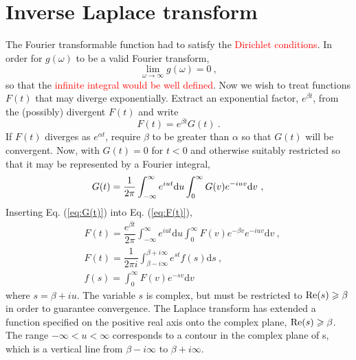 \documentclass[12pt,a4paper]{article}
\newcommand{\dif}{\mathrm{d}}
\begin{document}
\section{Inverse Laplace transform}
\cite{arfken} The Fourier transformable function had to satisfy the \textcolor{red}{Dirichlet conditions}. In order for $g(\omega)$ to be a valid Fourier transform,
\begin{equation}
\lim_{\omega \rightarrow \infty} g(\omega) = 0 ~,
\end{equation}
so that the \textcolor{red}{infinite integral would be well defined}. Now we wish to treat functions $F(t)$ that may diverge exponentially. Extract an exponential factor, $e^{\beta t}$, from the (possibly) divergent $F(t)$ and write
\begin{equation}
F(t) = e^{\beta t} G(t) ~.
\label{eq:F(t)}
\end{equation}
If $F(t)$ diverges as $e^{\alpha t}$, require $\beta$ to be greater than $\alpha$ so that $G(t)$ will be convergent. Now, with $G(t) = 0$ for $t < 0$ and otherwise suitably restricted so that it may be represented by a Fourier integral,
\begin{equation}
G(t) = \dfrac{1}{2\pi} \int_{-\infty}^\infty e^{iut} \dif u \int_0^\infty G(v) e^{-iuv} \dif v ~, \\
\label{eq:G(t)}
\end{equation}
Inserting Eq. (\ref{eq:G(t)}) into Eq. (\ref{eq:F(t)}), 
\begin{align*}
& F(t) = \dfrac{e^{\beta t}}{2\pi} \int_{-\infty}^\infty e^{iut} \dif u \int_0^\infty F(v) e^{-\beta v} e^{-iuv} \dif v ~, \\
& F(t) = \dfrac{1}{2\pi i} \int_{\beta -i\infty}^{\beta +i\infty } e^{st} f(s) \dif s ~, \\
& f(s) = \int_0^\infty F(v) e^{-s v} \dif v 
\end{align*}
where $s = \beta +i u$. The variable $s$ is complex, but must be restricted to ${\rm Re}(s) \geqslant \beta$ in order to guarantee convergence. The Laplace transform has extended a function specified on the positive real axis onto the complex plane, ${\rm Re}(s) \geqslant \beta$. The range $-\infty < u < \infty$ corresponds to a contour in the complex plane of s, which is a vertical line from $\beta -i \infty$ to $\beta + i\infty$.
\end{document}
